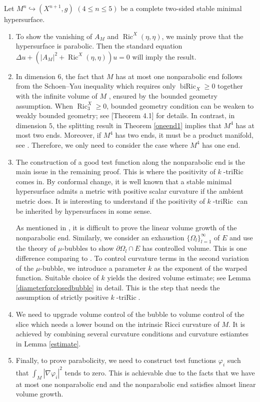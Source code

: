 \documentclass[11pt,letterpaper]{amsart}
\DeclareMathOperator{\Ric}{Ric}
\DeclareMathOperator{\biRic}{biRic}
\theoremstyle{definition}
\theoremstyle{remark}
\numberwithin{equation}{section}
\begin{document}
Let $M^n\hookrightarrow (X^{n+1},g)$ $(4\leq n\leq 5)$ be a complete two-sided stable minimal hypersurface.
\begin{enumerate}
    \item To show the vanishing of $A_M$ and $\operatorname{Ric}^X(\eta,\eta)$, we mainly prove that the hypersurface is parabolic. Then the standard equation $\Delta u+(|A_M|^2+\Ric^X(\eta,\eta)) u=0$ will imply the result.

    
    \item In dimension $6$, the fact that $M$ has at most one nonparabolic end follows from the Schoen--Yau inequality which requires only $\biRic_X\geq 0$ together with the infinite volume of $M$ , ensured by the bounded geometry assumption. When $\Ric^X_3\geq 0$, bounded geometry condition can be weaken to weakly bounded geometry; see \cite{chodosh-li-stryker}[Theorem 4.1] for details. In contrast, in dimension $5$, the splitting result in Theorem \ref{oneend1} implies that $M^4$ has at most two ends. Moreover, if $M^4$ has two ends, it must be a product manifold, see \cite{antonelli-pozzetta-xu,catino-Mari-Mastrolia-Roncoroni,hong-wang-spectral-splitting}. Therefore, we only need to consider the case where $M^4$ has one end.

    
    \item The construction of a good test function along the nonparabolic end is the main issue in the remaining proof.  This is where the positivity of $k\operatorname{-triRic}$ comes in. By conformal change, it is well known \cite{Schoen-Yau-PSC} that a stable minimal hypersurface admits a metric with positive scalar curvature if the ambient metric does. It is interesting to understand if the positivity of $k\operatorname{-triRic}$ can be inherited by hypersurfaces in some sense.


    As mentioned in \cite{chodosh-li-stryker}, it is difficult to prove the linear volume growth of the nonparabolic end. Similarly, we consider an exhaustion $\{\Omega_l\}_{l=1}^{\infty}$ of $E$ and use the theory of $\mu$-bubbles to show $\partial \Omega_l\cap E$ has controlled volume. This is one difference comparing to \cite{chodosh-li-stryker}. To control curvature terms in the second variation of the $\mu$-bubble, we introduce a parameter $k$ as the exponent of the warped function. Suitable choice of $k$ yields the desired volume estimate; see Lemma \ref{diameterforclosedbubble} in detail. This is the step that needs the assumption of strictly positive $k\operatorname{-triRic}$.  
    \item We need to upgrade volume control of the bubble to volume control of the slice which needs a lower bound on the intrinsic Ricci curvature of $M$. It is achieved by combining several curvature conditions and curvature estiamtes in Lemma \ref{estimate}.
    \item Finally, to prove parabolicity, we need to 
construct test functions $\varphi_i$ such that $\int_M|\nabla\varphi_i|^2$ tends to zero. This is achievable due to the facts that we have at most one nonparabolic end and the nonparabolic end satisfies almost linear volume growth.
    
\end{enumerate}
\end{document}
